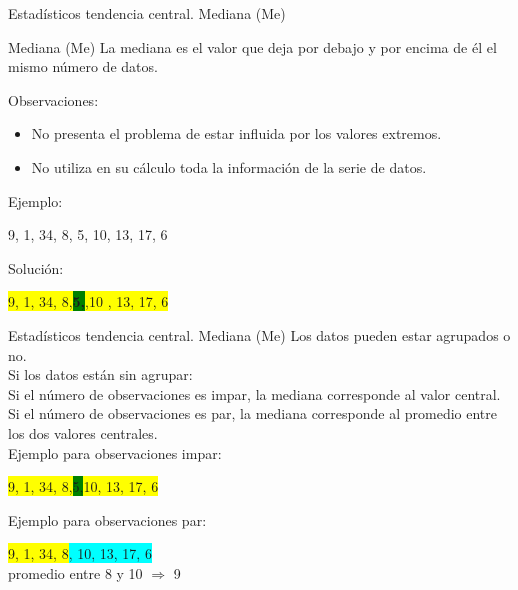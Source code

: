 \documentclass[11pt]{beamer}
\begin{document}
        \begin{frame}{Estadísticos tendencia central. Mediana (Me)}
            \begin{block}{Mediana (Me)}
                La mediana es el valor que deja por debajo y por encima de él el mismo  número de datos.
            \end{block}
            Observaciones:
            \begin{itemize}
                \item No presenta el problema de estar influida por los valores extremos.
                \item No utiliza en su cálculo toda la información de la serie de datos.
            \end{itemize}
            Ejemplo:
            \begin{center}
               9, 1, 34, 8, 5, 10, 13, 17, 6
            \end{center}
            \pause
            Solución:
            \begin{center}
              \colorbox{yellow}{  9, 1, 34, 8,}\textbf{\colorbox{green}{5,}}\colorbox{yellow}{,10 , 13, 17, 6 }
            \end{center}
        \end{frame}

        \begin{frame}{Estadísticos tendencia central. Mediana (Me)}
           Los datos pueden estar agrupados o no.\\

           \pause
           Si los datos están sin agrupar: \\
           Si el número de observaciones es impar, la mediana corresponde al valor central. Si el número de observaciones es par, la mediana corresponde al promedio entre los dos valores centrales.\\
           Ejemplo para observaciones impar:
           \begin{center}
               \colorbox{yellow}{9, 1, 34, 8,}\colorbox{green}{5,}\colorbox{yellow}{10, 13, 17, 6 }
           \end{center}

           Ejemplo para observaciones par:

           \begin{center}
             \colorbox{yellow}{  9, 1, 34, 8}\colorbox{cyan}{, 10, 13, 17, 6 } \\

             promedio entre 8 y 10 $ \Rightarrow$ 9
           \end{center}
        \end{frame}
\end{document}
